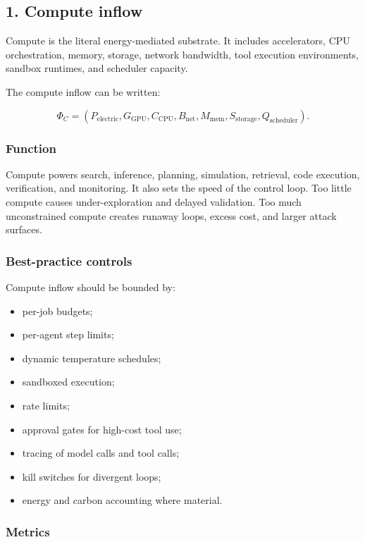 \documentclass[
  11pt,
]{article}
\providecommand{\tightlist}{%
  \setlength{\itemsep}{0pt}\setlength{\parskip}{0pt}}
\begin{document}
\subsection{1. Compute inflow}\label{compute-inflow}

Compute is the literal energy-mediated substrate. It includes
accelerators, CPU orchestration, memory, storage, network bandwidth,
tool execution environments, sandbox runtimes, and scheduler capacity.

The compute inflow can be written:

\[
\Phi_C=(P_{\text{electric}},G_{\text{GPU}},C_{\text{CPU}},B_{\text{net}},M_{\text{mem}},S_{\text{storage}},Q_{\text{scheduler}}).
\]

\subsubsection{Function}\label{function}

Compute powers search, inference, planning, simulation, retrieval, code
execution, verification, and monitoring. It also sets the speed of the
control loop. Too little compute causes under-exploration and delayed
validation. Too much unconstrained compute creates runaway loops, excess
cost, and larger attack surfaces.

\subsubsection{Best-practice controls}\label{best-practice-controls}

Compute inflow should be bounded by:

\begin{itemize}
\tightlist
\item
  per-job budgets;
\item
  per-agent step limits;
\item
  dynamic temperature schedules;
\item
  sandboxed execution;
\item
  rate limits;
\item
  approval gates for high-cost tool use;
\item
  tracing of model calls and tool calls;
\item
  kill switches for divergent loops;
\item
  energy and carbon accounting where material.
\end{itemize}

\subsubsection{Metrics}\label{metrics}
\end{document}
